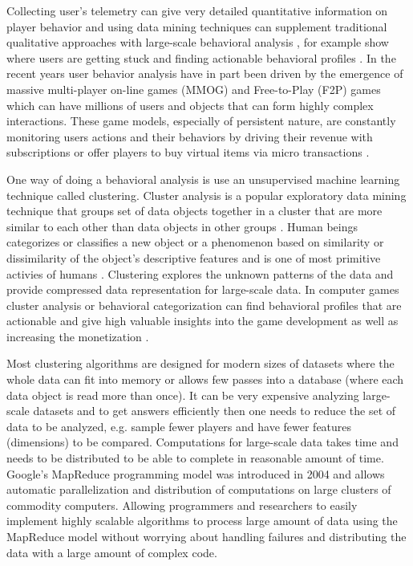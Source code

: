 Collecting user's telemetry can give very detailed quantitative information on player behavior and using data mining techniques can supplement traditional qualitative approaches with large-scale behavioral analysis \citep{Yannakakis:2012}, for example show where users are getting stuck and finding actionable behavioral profiles \citep{Kim:2008Tracking, Drachen:2012, Drachen:2011Evaluating}. In the recent years user behavior analysis have in part been driven by the emergence of massive multi-player on-line games (MMOG) and Free-to-Play (F2P) games which can have millions of users and objects that can form highly complex interactions. These game models, especially of persistent nature, are constantly monitoring users actions and their behaviors by driving their revenue with subscriptions or offer players to buy virtual items via micro transactions \citep{Kim:2008Tracking, Drachen:2011Evaluating, Fields:2011SocialGame, Seif:2013GameAnalytics}. 

One way of doing a behavioral analysis is use an unsupervised machine learning technique called clustering. Cluster analysis is a popular exploratory data mining technique that groups set of data objects together in a cluster that are more similar to each other than data objects in other groups \citep{Xu:2005Clustering}. Human beings categorizes or classifies a new object or a phenomenon based on similarity or dissimilarity of the object's descriptive features and is one of most primitive activies of humans \citep{Anderberg:1973ClusterAnalysis}. Clustering explores the unknown patterns of the data and provide compressed data representation for large-scale data. In computer games cluster analysis or behavioral categorization can find behavioral profiles that are actionable and give high valuable insights into the game development as well as increasing the monetization \cite{Drachen:2009Tomb, Mahlmann:2010Tomb}. 

Most clustering algorithms are designed for modern sizes of datasets where the whole data can fit into memory or allows few passes into a database (where each data object is read more than once). It can be very expensive analyzing large-scale datasets and to get answers efficiently then one needs to reduce the set of data to be analyzed, e.g. sample fewer players and have fewer features (dimensions) to be compared. Computations for large-scale data takes time and needs to be distributed to be able to complete in reasonable amount of time. Google's MapReduce programming model was introduced in 2004 \citep{Dean:2004} and allows automatic parallelization and distribution of computations on large clusters of commodity computers. Allowing programmers and researchers to easily implement highly scalable algorithms to process large amount of data using the MapReduce model without worrying about handling failures and distributing the data with a large amount of complex code. 

